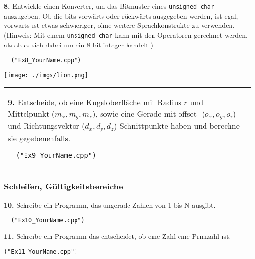\documentclass[paper=A4, pagesize, DIV=calc, smallheadings,
fontsize=11pt, expansion=false]{scrreprt}
\begin{document}
\textbf{8.} Entwickle einen Konverter, um das Bitmuster eines \texttt{unsigned char} auszugeben. Ob die bits vorwärts oder rückwärts ausgegeben werden, ist egal, vorwärts ist etwas schwieriger, ohne weitere Sprachkonstrukte zu verwenden.\\
  (Hinweis: Mit einem \texttt{unsigned char} kann mit den Operatoren%
 gerechnet werden, als ob es sich dabei um ein 8-bit integer handelt.)
\begin{verbatim}
  ("Ex8_YourName.cpp")
\end{verbatim}



\begin{minipage}[H]{0.3\linewidth}
\texttt{[image: ./imgs/lion.png]}
\end{minipage}
\begin{tabular}{ m{30em}}
\textbf{9.} Entscheide, ob eine Kugeloberfläche mit Radius $r$ und Mittelpunkt ($m_x, m_y, m_z$), sowie eine Gerade mit offset- ($o_x, o_y, o_z$) und Richtungsvektor ($d_x, d_y, d_z$) Schnittpunkte haben und berechne sie gegebenenfalls.%
\begin{verbatim}
  ("Ex9_YourName.cpp") 
\end{verbatim}
\end{tabular}



\subsubsection*{Schleifen, Gültigkeitsbereiche}
\textbf{10.} Schreibe ein Programm, das ungerade Zahlen von 1 bis N ausgibt.
\begin{verbatim}
  ("Ex10_YourName.cpp")
\end{verbatim}



\textbf{11.} Schreibe ein Programm das entscheidet, ob eine Zahl eine Primzahl ist.
\begin{verbatim}
("Ex11_YourName.cpp")
\end{verbatim}
\end{document}
